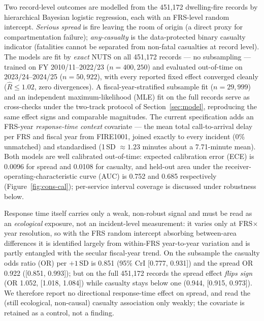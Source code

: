 Two record-level outcomes are modelled from the 451{,}172 dwelling-fire records by
hierarchical Bayesian logistic regression, each with an FRS-level random intercept.
\emph{Serious spread} is fire leaving the room of origin (a direct proxy for
compartmentation failure); \emph{any-casualty} is the data-protected binary
casualty indicator (fatalities cannot be separated from non-fatal casualties at
record level). The models are fit by \emph{exact} NUTS on all 451{,}172 records
--- no subsampling --- trained on FY 2010/11--2022/23 ($n=400{,}250$) and
evaluated out-of-time on 2023/24--2024/25 ($n=50{,}922$), with every reported
fixed effect converged cleanly ($\hat{R} \le 1.02$, zero divergences). A
fiscal-year-stratified subsample fit ($n=29{,}999$) and an independent
maximum-likelihood (MLE) fit on the full records serve as cross-checks under the
two-track protocol of Section~\ref{sec:model}, reproducing the same effect signs
and comparable magnitudes. The current specification adds an
FRS-year \emph{response-time context} covariate --- the mean total call-to-arrival
delay per FRS and fiscal year from FIRE1001, joined exactly to every incident (0\% unmatched) and
standardised (1\,SD $\approx 1.23$ minutes about a 7.71-minute mean). Both models
are well calibrated out-of-time: expected calibration error (ECE) is 0.0096 for
spread and 0.0108 for casualty, and held-out area under the
receiver-operating-characteristic curve (AUC) is 0.752 and 0.685 respectively
(Figure~\ref{fig:cons-cal}); per-service interval coverage is discussed under
robustness below.

Response time itself carries only a weak, non-robust signal and must be read as an
\emph{ecological} exposure, not an incident-level measurement: it varies only at
FRS$\times$year resolution, so with the FRS random intercept absorbing between-area
differences it is identified largely from within-FRS year-to-year variation and is
partly entangled with the secular fiscal-year trend. On the subsample the casualty
odds ratio (OR) per $+1$\,SD is 0.851 (95\% CrI [0.777, 0.931]) and the spread OR
0.922 ([0.851, 0.993]); but on the full 451{,}172 records the spread effect
\emph{flips sign} (OR 1.052, [1.018, 1.084]) while casualty stays below one
(0.944, [0.915, 0.973]). We therefore report no directional response-time effect on spread, and read
the (still ecological, non-causal) casualty association only weakly; the covariate is
retained as a control, not a finding.

